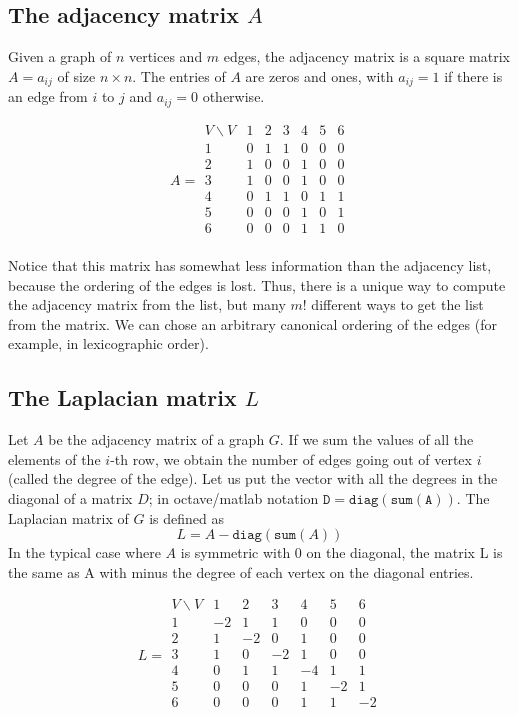 \subsection{The adjacency matrix $A$}


Given a graph of $n$ vertices and $m$ edges,
the adjacency matrix is a square matrix $A=a_{ij}$ of size $n\times n$.
The entries of $A$ are zeros and ones, with $a_{ij}=1$ if there is an edge
from $i$ to $j$ and $a_{ij}=0$ otherwise.

$$
A =
\begin{array}{l|lllllll}
	V\backslash V
	  & 1 & 2 & 3 & 4 & 5 & 6 \\
	\hline
	1 & 0 & 1 & 1 & 0 & 0 & 0 \\
	2 & 1 & 0 & 0 & 1 & 0 & 0 \\
	3 & 1 & 0 & 0 & 1 & 0 & 0 \\
	4 & 0 & 1 & 1 & 0 & 1 & 1 \\
	5 & 0 & 0 & 0 & 1 & 0 & 1 \\
	6 & 0 & 0 & 0 & 1 & 1 & 0 \\
\end{array}
$$

Notice that this matrix has somewhat less information than the adjacency
list, because the ordering of the edges is lost.  Thus, there is a unique way
to compute the adjacency matrix from the list, but many $m!$ different ways
to get the list from the matrix.  We can chose an arbitrary canonical
ordering of the edges (for example, in lexicographic order).


\subsection{The Laplacian matrix $L$}


Let $A$ be the adjacency matrix of a graph $G$.
If we sum the values of all the elements of the $i$-th row, we obtain the
number of edges going out of vertex $i$ (called the degree of the edge).
Let us put the vector with all the degrees in the diagonal of a matrix $D$; in
octave/matlab notation $\mathtt{D=diag(sum(A))}$.
The Laplacian matrix of $G$ is defined as
\[
L = A - \mathtt{diag}(\mathtt{sum}(A))
\]
In the typical case where $A$ is symmetric with 0 on the diagonal, the matrix
L is the same as A with minus the degree of each vertex on the diagonal
entries.

$$
L =
\begin{array}{l|lllllll}
	V\backslash V
	  & 1 & 2 & 3 & 4 & 5 & 6 \\
	\hline
	1 &-2 & 1 & 1 & 0 & 0 & 0 \\
	2 & 1 &-2 & 0 & 1 & 0 & 0 \\
	3 & 1 & 0 &-2 & 1 & 0 & 0 \\
	4 & 0 & 1 & 1 &-4 & 1 & 1 \\
	5 & 0 & 0 & 0 & 1 &-2 & 1 \\
	6 & 0 & 0 & 0 & 1 & 1 &-2 \\
\end{array}
$$



